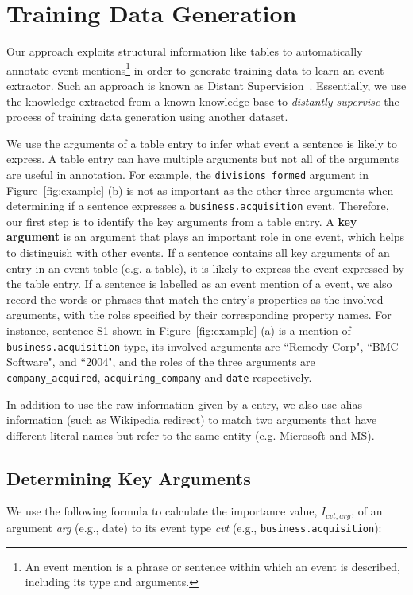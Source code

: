 \section{Training Data Generation}
Our approach exploits structural information like \FB \CVT tables to  automatically annotate event mentions\footnote{An event mention is a
phrase or sentence within which an event is described, including its type and arguments.} in order to generate training data to learn an
event extractor. Such an approach is known as Distant Supervision~\cite{mintz2009distant}. Essentially, we use the knowledge extracted from
a known knowledge base to \emph{distantly supervise} the process of training data generation using another dataset.


We use the arguments of a \CVT table entry to infer what event a sentence is likely to express. A \CVT table entry can have multiple
arguments but not all of the arguments are useful in annotation. For example, the \texttt{divisions\_formed} argument in
Figure~\ref{fig:example} (b) is not as important as the other three arguments when determining if a sentence expresses a
\texttt{business.acquisition} event. Therefore, our first step is to identify the key arguments from a \CVT table entry. A \textbf{key
argument} is an argument that plays an important role in one event, which helps to distinguish with other events. If a sentence contains
all key arguments of an entry in an event table (e.g. a \CVT table), it is likely to express the event expressed by the table entry. If a
sentence is labelled as an event mention of a \CVT event, we also record the words or phrases that match the entry’s properties as the
involved arguments, with the roles specified by their corresponding property names. For instance, sentence S1 shown in
Figure~\ref{fig:example} (a) is a mention of \texttt{business.acquisition} type, its involved arguments are ``Remedy Corp", ``BMC
Software", and ``2004", and the roles of the three arguments are \texttt{company\_acquired}, \texttt{acquiring\_company} and \texttt{date}
respectively.

In addition to use the raw information given by a \CVT entry, we also use alias information (such as Wikipedia redirect) to match two
arguments that have different literal names but refer to the same entity (e.g. Microsoft and MS).

\subsection{Determining Key Arguments}
We use the following formula to calculate the importance value, $I_{cvt, arg}$, of an argument \emph{arg} (e.g., date) to its event type
\emph{cvt} (e.g., \texttt{business.acquisition}):

